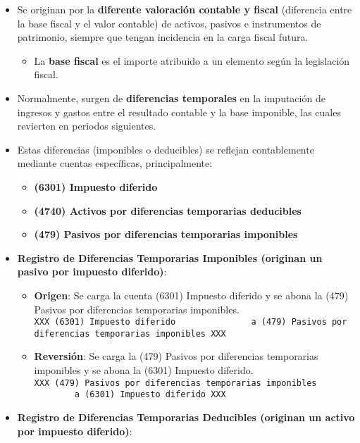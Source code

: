 \documentclass[
  paper=a4,
  ,captions=tableheading
]{scrbook}
\providecommand{\tightlist}{%
  \setlength{\itemsep}{0pt}\setlength{\parskip}{0pt}}
\begin{document}
\begin{itemize}
\tightlist
\item
  Se originan por la \textbf{diferente valoración contable y fiscal}
  (diferencia entre la base fiscal y el valor contable) de activos,
  pasivos e instrumentos de patrimonio, siempre que tengan incidencia en
  la carga fiscal futura.

  \begin{itemize}
  \tightlist
  \item
    La \textbf{base fiscal} es el importe atribuido a un elemento según
    la legislación fiscal.
  \end{itemize}
\item
  Normalmente, surgen de \textbf{diferencias temporales} en la
  imputación de ingresos y gastos entre el resultado contable y la base
  imponible, las cuales revierten en periodos siguientes.
\item
  Estas diferencias (imponibles o deducibles) se reflejan contablemente
  mediante cuentas específicas, principalmente:

  \begin{itemize}
  \tightlist
  \item
    \textbf{(6301) Impuesto diferido}
  \item
    \textbf{(4740) Activos por diferencias temporarias deducibles}
  \item
    \textbf{(479) Pasivos por diferencias temporarias imponibles}
  \end{itemize}
\item
  \textbf{Registro de Diferencias Temporarias Imponibles (originan un
  pasivo por impuesto diferido)}:

  \begin{itemize}
  \tightlist
  \item
    \textbf{Origen}: Se carga la cuenta (6301) Impuesto diferido y se
    abona la (479) Pasivos por diferencias temporarias imponibles.
    \texttt{XXX\ (6301)\ Impuesto\ diferido\ \ \ \ \ \ \ \ \ \ \ \ \ \ \ a\ (479)\ Pasivos\ por\ diferencias\ temporarias\ imponibles\ XXX}
  \item
    \textbf{Reversión}: Se carga la (479) Pasivos por diferencias
    temporarias imponibles y se abona la (6301) Impuesto diferido.
    \texttt{XXX\ (479)\ Pasivos\ por\ diferencias\ temporarias\ imponibles\ \ \ \ \ \ \ \ \ \ \ \ \ \ \ a\ (6301)\ Impuesto\ diferido\ XXX}
  \end{itemize}
\item
  \textbf{Registro de Diferencias Temporarias Deducibles (originan un
  activo por impuesto diferido)}:


\end{itemize}
\end{document}

